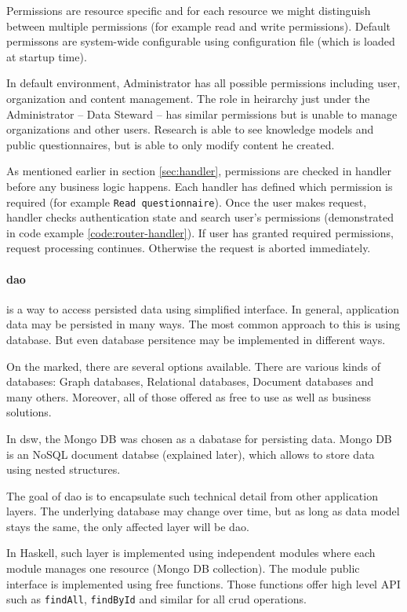 Permissions are resource specific and for each resource we might distinguish between multiple permissions (for example read and write permissions).
Default permissons are system-wide configurable using configuration file (which is loaded at startup time).

In default environment, Administrator has all possible permissions including user, organization and content management.
The role in heirarchy just under the Administrator -- Data Steward -- has similar permissions but is unable to manage organizations and other users.
Research is able to see knowledge models and public questionnaires, but is able to only modify content he created.

As mentioned earlier in section \ref{sec:handler}, permissions are checked in handler before any business logic happens.
Each handler has defined which permission is required (for example \texttt{Read questionnaire}).
Once the user makes request, handler checks authentication state and search user's permissions (demonstrated in code example \ref{code:router-handler}).
If user has granted required permissions, request processing continues.
Otherwise the request is aborted immediately.

\paragraph*{\gls{dao}}\label{sec:dao} is a way to access persisted data using simplified interface.
In general, application data may be persisted in many ways.
The most common approach to this is using database. 
But even database persitence may be implemented in different ways.

On the marked, there are several options available.
There are various kinds of databases: Graph databases, Relational databases, Document databases and many others.
Moreover, all of those offered as free to use as well as business solutions.

In \gls{dsw}, the Mongo DB was chosen as a dabatase for persisting data.
Mongo DB is an NoSQL document databse (explained later), which allows to store data using nested structures.

The goal of \gls{dao} is to encapsulate such technical detail from other application layers.
The underlying database may change over time, but as long as data model stays the same, the only affected layer will be \gls{dao}.

In Haskell, such layer is implemented using independent modules where each module manages one resource (Mongo DB collection).
The module public interface is implemented using free functions.
Those functions offer high level API such as \texttt{findAll}, \texttt{findById} and similar for all \gls{crud} operations.

